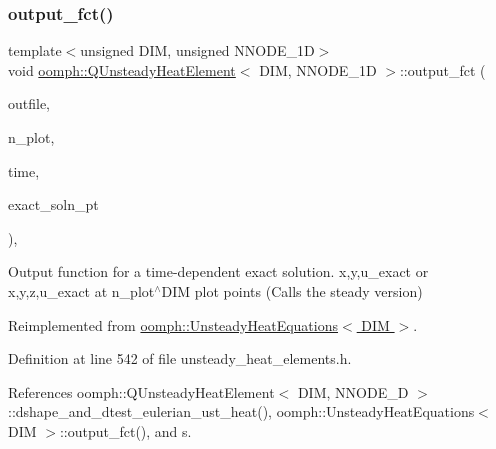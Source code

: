 \subsubsection{\texorpdfstring{output\+\_\+fct()}{output\_fct()}\hspace{0.1cm}{\footnotesize\ttfamily [2/2]}}
{\footnotesize\ttfamily template$<$unsigned D\+IM, unsigned N\+N\+O\+D\+E\+\_\+1D$>$ \\
void \hyperlink{classoomph_1_1QUnsteadyHeatElement}{oomph\+::\+Q\+Unsteady\+Heat\+Element}$<$ D\+IM, N\+N\+O\+D\+E\+\_\+1D $>$\+::output\+\_\+fct (\begin{DoxyParamCaption}\item[{std\+::ostream \&}]{outfile,  }\item[{const unsigned \&}]{n\+\_\+plot,  }\item[{const double \&}]{time,  }\item[{\hyperlink{classoomph_1_1FiniteElement_ad4ecf2b61b158a4b4d351a60d23c633e}{Finite\+Element\+::\+Unsteady\+Exact\+Solution\+Fct\+Pt}}]{exact\+\_\+soln\+\_\+pt }\end{DoxyParamCaption})\hspace{0.3cm}{\ttfamily [inline]}, {\ttfamily [virtual]}}



Output function for a time-\/dependent exact solution. x,y,u\+\_\+exact or x,y,z,u\+\_\+exact at n\+\_\+plot$^\wedge$\+D\+IM plot points (Calls the steady version) 



Reimplemented from \hyperlink{classoomph_1_1UnsteadyHeatEquations_ab6f0a3d6afeec2fc0395f6185d91e588}{oomph\+::\+Unsteady\+Heat\+Equations$<$ D\+I\+M $>$}.



Definition at line 542 of file unsteady\+\_\+heat\+\_\+elements.\+h.



References oomph\+::\+Q\+Unsteady\+Heat\+Element$<$ D\+I\+M, N\+N\+O\+D\+E\+\_\+D $>$\+::dshape\+\_\+and\+\_\+dtest\+\_\+eulerian\+\_\+ust\+\_\+heat(), oomph\+::\+Unsteady\+Heat\+Equations$<$ D\+I\+M $>$\+::output\+\_\+fct(), and s.

\mbox{\label{classoomph_1_1QUnsteadyHeatElement_abd2a8d2835bd9bd57119811d4c765e02}} 
